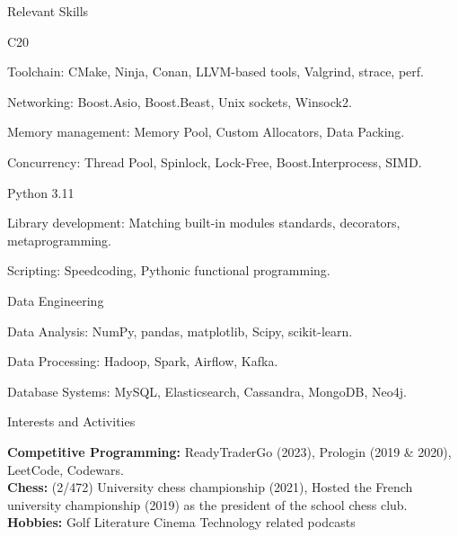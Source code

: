 \documentclass[
	a4paper, %
	10pt, %
]{resume} %
\def\CC{{C\nolinebreak[4]\hspace{-.05em}\raisebox{.4ex}{\tiny\bf ++}}}
\begin{document}
\begin{rSection}{Relevant Skills}
	\begin{rSubsection}{\CC20}{}{}{}
    \item Toolchain: CMake, Ninja, Conan, LLVM-based tools, Valgrind, strace, perf.
    \item Networking: Boost.Asio, Boost.Beast,  Unix sockets, Winsock2.
    \item Memory management: Memory Pool, Custom Allocators, Data Packing.
    \item Concurrency: Thread Pool, Spinlock, Lock-Free, Boost.Interprocess, SIMD.
  \end{rSubsection}

  \begin{rSubsection}{Python 3.11}{}{}{}
    \item Library development: Matching built-in modules standards, decorators, metaprogramming.
    \item Scripting: Speedcoding, Pythonic functional programming.
  \end{rSubsection}

  \begin{rSubsection}{Data Engineering}{}{}{}
    \item Data Analysis: NumPy, pandas, matplotlib, Scipy, scikit-learn.
    \item Data Processing: Hadoop, Spark, Airflow, Kafka.
    \item Database Systems: MySQL, Elasticsearch, Cassandra, MongoDB, Neo4j.
  \end{rSubsection}
\end{rSection}


\begin{rSection}{Interests and Activities}

	\textbf{Competitive Programming:} ReadyTraderGo (2023), Prologin (2019 \& 2020), LeetCode, Codewars. \\
	\textbf{Chess:} (2/472) University chess championship (2021), Hosted the French university championship (2019) as the president of the school chess club. \\
  \textbf{Hobbies:} Golf  Literature  Cinema  Technology related podcasts
\end{rSection}
\end{document}
